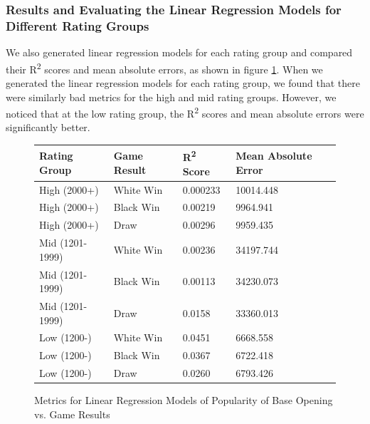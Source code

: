 \documentclass[a4paper, 11pt]{article}
\begin{document}
\begin{figure}[H]
\begin{subfigure}{0.49\textwidth}
    \end{subfigure}
\end{figure}

\subsubsection{Results and Evaluating the Linear Regression Models for Different Rating Groups}
We also generated linear regression models for each rating group and compared their R\textsuperscript{2} scores and mean absolute errors, as shown in figure \ref{fig:metricsForLinearRegressionModelsOfPopularityOfBaseOpeningVsGameResults}. When we generated the linear regression models for each rating group, we found that there were similarly bad metrics for the high and mid rating groups. However, we noticed that at the low rating group, the R\textsuperscript{2} scores and mean absolute errors were significantly better.

\begin{figure}[H]
    \centering
    \caption{Metrics for Linear Regression Models of Popularity of Base Opening vs. Game Results}
    \label{fig:metricsForLinearRegressionModelsOfPopularityOfBaseOpeningVsGameResults}
    \begin{tabular}{| l | l | l | l |} 
        \hline
        \bf{Rating Group} & \bf{Game Result} & \bf{R\textsuperscript{2} Score} & \bf{Mean Absolute Error} \\ [0.5ex] 
        \hline
        High (2000+) & White Win & 0.000233 & 10014.448 \\
        \hline
        High (2000+) & Black Win & 0.00219 & 9964.941 \\
        \hline
        High (2000+) & Draw & 0.00296 & 9959.435 \\
        \hline
        Mid (1201-1999) & White Win & 0.00236 & 34197.744 \\
        \hline
        Mid (1201-1999) & Black Win & 0.00113 & 34230.073 \\
        \hline
        Mid (1201-1999) & Draw & 0.0158 & 33360.013 \\
        \hline
        Low (1200-) & White Win & 0.0451 & 6668.558 \\
        \hline
        Low (1200-) & Black Win & 0.0367 & 6722.418 \\
        \hline
        Low (1200-) & Draw & 0.0260 & 6793.426 \\
        \hline
    \end{tabular}
\end{figure}
\end{document}
